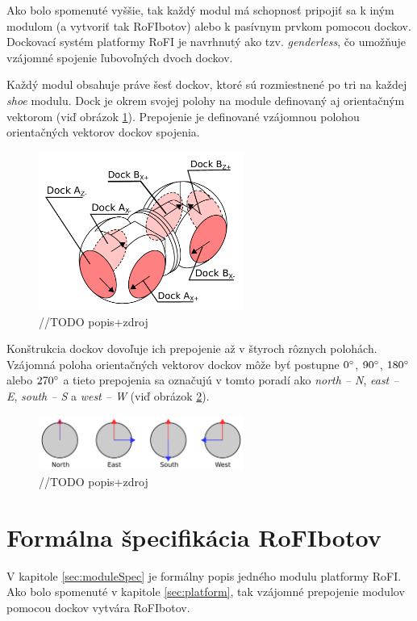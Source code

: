 \documentclass[
  digital, %
  twoside, %
  table,   %
  nolof,     %
  nolot,     %
]{fithesis3}
\begin{document}
Ako bolo spomenuté vyššie, tak každý modul má schopnosť pripojiť sa k iným modulom (a vytvoriť tak RoFIbotov) alebo k pasívnym prvkom pomocou dockov. Dockovací systém platformy RoFI je navrhnutý ako tzv. \textit{genderless}, čo umožňuje vzájomné spojenie ľubovoľných dvoch dockov. 

Každý modul obsahuje práve šesť dockov, ktoré sú rozmiestnené po tri na každej \textit{shoe} modulu. Dock je okrem svojej polohy na module definovaný aj orientačným vektorom (viď obrázok \ref{fig:dock_desc}). Prepojenie je definované vzájomnou polohou orientačných vektorov dockov spojenia.

\begin{figure}[htbp]
    \centering
    \includegraphics[width=0.6\textwidth]{pictures/dock_desc.pdf}
    \caption{//TODO popis+zdroj}
    \label{fig:dock_desc}
\end{figure}

Konštrukcia dockov dovoľuje ich prepojenie až v štyroch rôznych polohách. Vzájomná poloha orientačných vektorov dockov môže byť postupne $0\degree$, $90\degree$, $180\degree$ alebo $270\degree$ a tieto prepojenia sa označujú v tomto poradí ako \textit{north -- N}, \textit{east -- E}, \textit{south -- S} a \textit{west -- W} (viď obrázok \ref{fig:dock_orientation}). 

\begin{figure}[htbp]
    \centering
    \includegraphics[width=0.6\textwidth]{pictures/dock_orientation.pdf}
    \caption{//TODO popis+zdroj}
    \label{fig:dock_orientation}
\end{figure}

\section{Formálna špecifikácia RoFIbotov}
\label{sec:rofibotSec}
V kapitole \ref{sec:moduleSpec} je formálny popis jedného modulu platformy RoFI. Ako bolo spomenuté v kapitole \ref{sec:platform}, tak vzájomné prepojenie modulov pomocou dockov vytvára RoFIbotov. 
\end{document}
